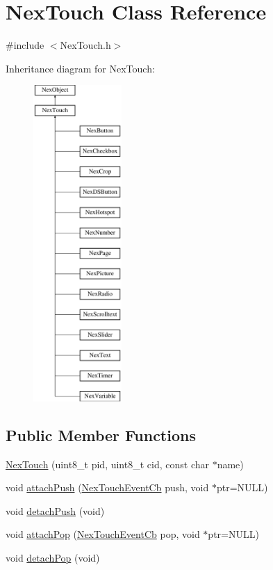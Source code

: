 \hypertarget{class_nex_touch}{\section{Nex\+Touch Class Reference}
\label{class_nex_touch}
}


{\ttfamily \#include $<$Nex\+Touch.\+h$>$}

Inheritance diagram for Nex\+Touch\+:\begin{figure}[H]
\begin{center}
\leavevmode
\includegraphics[height=12.000000cm]{class_nex_touch}
\end{center}
\end{figure}
\subsection*{Public Member Functions}
\begin{DoxyCompactItemize}
\item 
\hyperlink{class_nex_touch_a9e028e45e0d2d2cc39c8bf8d03dbb887}{Nex\+Touch} (uint8\+\_\+t pid, uint8\+\_\+t cid, const char $\ast$name)
\item 
void \hyperlink{class_nex_touch_a685a753aae5eb9fb9866a7807a310132}{attach\+Push} (\hyperlink{group___touch_event_ga162dea47b078e8878d10d6981a9dd0c6}{Nex\+Touch\+Event\+Cb} push, void $\ast$ptr=N\+U\+L\+L)
\item 
void \hyperlink{class_nex_touch_a2bc36096119534344c2bcd8021b93289}{detach\+Push} (void)
\item 
void \hyperlink{class_nex_touch_a4da1c4fcdfadb7eabfb9ccaba9ecad11}{attach\+Pop} (\hyperlink{group___touch_event_ga162dea47b078e8878d10d6981a9dd0c6}{Nex\+Touch\+Event\+Cb} pop, void $\ast$ptr=N\+U\+L\+L)
\item 
void \hyperlink{class_nex_touch_af656640c1078a553287a68bf792dd291}{detach\+Pop} (void)
\end{DoxyCompactItemize}
